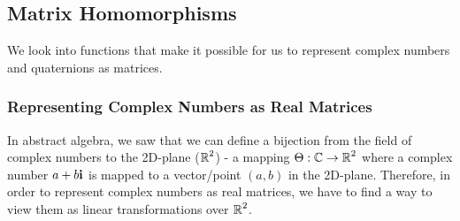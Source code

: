 \subsection{Matrix Homomorphisms}

We look into functions that make it possible for us to represent complex numbers and quaternions as matrices. 
\iffalse
\subsubsection{Representing Complex Numbers as Real Matrices}

In abstract algebra, we saw that we can define a bijection from the field of complex numbers to the 2D-plane ($\operatorname{\mathbb{R}}^2$) - a mapping $\Theta : \operatorname{\mathbb{C}} \rightarrow \operatorname{\mathbb{R}}^2$ where a complex number $a+b\textbf{i}$ is mapped to a vector/point $(a,b)$ in the 2D-plane. Therefore, in order to represent complex numbers as real matrices, we have to find a way to view them as linear transformations over $\operatorname{\mathbb{R}}^2$. 

